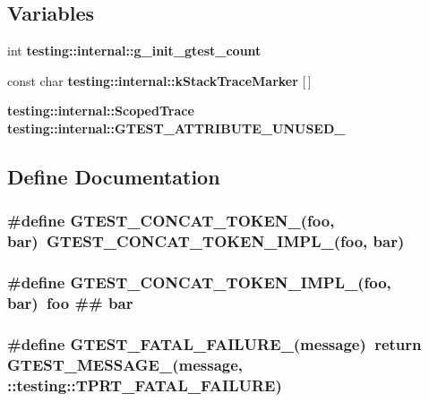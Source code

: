 \subsection*{Variables}
\begin{CompactItemize}
\item 
int {\bf testing::internal::g\_\-init\_\-gtest\_\-count}
\item 
const char {\bf testing::internal::kStackTraceMarker} [$\,$]
\item 
{\bf testing::internal::ScopedTrace} {\bf testing::internal::GTEST\_\-ATTRIBUTE\_\-UNUSED\_\-}
\end{CompactItemize}


\subsection{Define Documentation}
\subsubsection{\setlength{\rightskip}{0pt plus 5cm}\#define GTEST\_\-CONCAT\_\-TOKEN\_\-(foo, bar)~GTEST\_\-CONCAT\_\-TOKEN\_\-IMPL\_\-(foo, bar)}\label{gtest-internal_8h_379cc8ac79c138b1313b8e86ce7772d3}


\subsubsection{\setlength{\rightskip}{0pt plus 5cm}\#define GTEST\_\-CONCAT\_\-TOKEN\_\-IMPL\_\-(foo, bar)~foo \#\# bar}\label{gtest-internal_8h_ffecc6107e87e253f0d2ec65ea047d76}


\subsubsection{\setlength{\rightskip}{0pt plus 5cm}\#define GTEST\_\-FATAL\_\-FAILURE\_\-(message)~return GTEST\_\-MESSAGE\_\-(message, ::testing::TPRT\_\-FATAL\_\-FAILURE)}\label{gtest-internal_8h_72658de9b27092fb1db0c03b9b710f0f}


